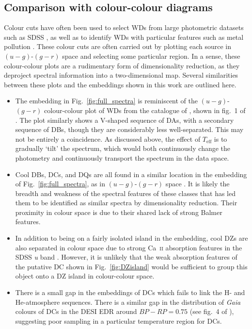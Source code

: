 \documentclass[fleqn,usenatbib]{mnras}
\def\Teff{T_\mathrm{eff}}
\begin{document}
\subsection{Comparison with colour-colour diagrams}
\label{sec:colourcolour}

Colour cuts have often been used to select WDs from large photometric datasets such as SDSS \citep{eisenstein06, gentilefusillo15}, as well as to identify WDs with particular features such as metal pollution \citep{hollands15}.
These colour cuts are often carried out by plotting each source in $(u-g)$-$(g-r)$ space and selecting some particular region.
In a sense, these colour-colour plots are a rudimentary form of dimensionality reduction, as they deproject spectral information into a two-dimensional map.
Several similarities between these plots and the embeddings shown in this work are outlined here.

\begin{itemize}
\item
The embedding in Fig.~\ref{fig:full_spectra} is reminiscent of the $(u-g)$-$(g-r)$ colour-colour plot of WDs from the catalogue of \citet{gentilefusillo19}, shown in fig.~1 of \citet{manser20}.
The plot similarly shows a V-shaped sequence of DAs, with a secondary sequence of DBs, though they are considerably less well-separated.
This may not be entirely a coincidence.
As discussed above, the effect of $\Teff$ is to gradually `tilt' the spectrum, which would both continuously change the photometry and continuously transport the spectrum in the data space.
\item
Cool DBs, DCs, and DQs are all found in a similar location in the embedding of Fig.~\ref{fig:full_spectra}, as in $(u-g)$-$(g-r)$ space \citep{manser20}.
It is likely the breadth and weakness of the spectral features of these classes that has led them to be identified as similar spectra by dimensionality reduction.
Their proximity in colour space is due to their shared lack of strong Balmer features.
\item
In addition to being on a fairly isolated island in the embedding, cool DZs are also separated in colour space due to strong Ca~\textsc{ii} absorption features in the SDSS \textit{u} band \citep{hollands15}.
However, it is unlikely that the weak absorption features of the putative DC shown in Fig.~\ref{fig:DZisland} would be sufficient to group this object onto a DZ island in colour-colour space.
\item
There is a small gap in the embeddings of DCs which fails to link the H- and He-atmosphere sequences.
There is a similar gap in the distribution of \textit{Gaia} colours of DCs in the DESI EDR around $\mathit{BP}-\mathit{RP}=0.75$ (see fig.~4 of \citealt{manser24}), suggesting poor sampling in a particular temperature region for DCs.
\end{itemize}
\end{document}
